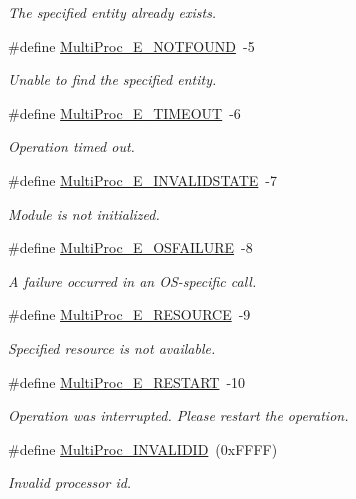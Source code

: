 \begin{DoxyCompactItemize}
\begin{DoxyCompactList}\small\item\em The specified entity already exists. \end{DoxyCompactList}\item 
\#define \hyperlink{_multi_proc_8h_a94763088a2d466568560a039ea675290}{Multi\-Proc\-\_\-\-E\-\_\-\-N\-O\-T\-F\-O\-U\-N\-D}~-\/5
\begin{DoxyCompactList}\small\item\em Unable to find the specified entity. \end{DoxyCompactList}\item 
\#define \hyperlink{_multi_proc_8h_a2f6b71bcbab4cfe1c69f1c5a9403a3d5}{Multi\-Proc\-\_\-\-E\-\_\-\-T\-I\-M\-E\-O\-U\-T}~-\/6
\begin{DoxyCompactList}\small\item\em Operation timed out. \end{DoxyCompactList}\item 
\#define \hyperlink{_multi_proc_8h_a4d77c2159e3d47966e8306c486e0c2da}{Multi\-Proc\-\_\-\-E\-\_\-\-I\-N\-V\-A\-L\-I\-D\-S\-T\-A\-T\-E}~-\/7
\begin{DoxyCompactList}\small\item\em Module is not initialized. \end{DoxyCompactList}\item 
\#define \hyperlink{_multi_proc_8h_aae22e0e82ebcff6fcdfb22b0ae26ff7b}{Multi\-Proc\-\_\-\-E\-\_\-\-O\-S\-F\-A\-I\-L\-U\-R\-E}~-\/8
\begin{DoxyCompactList}\small\item\em A failure occurred in an O\-S-\/specific call. \end{DoxyCompactList}\item 
\#define \hyperlink{_multi_proc_8h_aa72d734728c7c0fc99353e9fdc89d9a1}{Multi\-Proc\-\_\-\-E\-\_\-\-R\-E\-S\-O\-U\-R\-C\-E}~-\/9
\begin{DoxyCompactList}\small\item\em Specified resource is not available. \end{DoxyCompactList}\item 
\#define \hyperlink{_multi_proc_8h_aa7adeed5b18aeefd77fb57e333974d5d}{Multi\-Proc\-\_\-\-E\-\_\-\-R\-E\-S\-T\-A\-R\-T}~-\/10
\begin{DoxyCompactList}\small\item\em Operation was interrupted. Please restart the operation. \end{DoxyCompactList}\item 
\#define \hyperlink{_multi_proc_8h_a94a1d14527833bc8294407634d5495d9}{Multi\-Proc\-\_\-\-I\-N\-V\-A\-L\-I\-D\-I\-D}~(0x\-F\-F\-F\-F)
\begin{DoxyCompactList}\small\item\em Invalid processor id. \end{DoxyCompactList}\end{DoxyCompactItemize}
